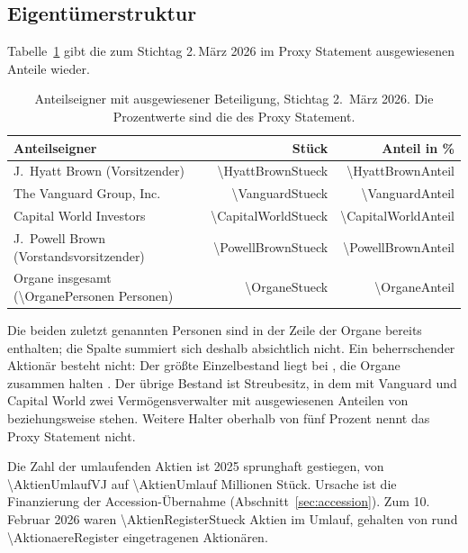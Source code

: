 \subsection{Eigent\"umerstruktur}

Tabelle~\ref{tab:eigentuemer} gibt die zum Stichtag 2.\,M\"arz 2026 im Proxy
Statement ausgewiesenen Anteile wieder.

\begin{table}[htbp]
\centering
\caption{Anteilseigner mit ausgewiesener Beteiligung, Stichtag 2.~M\"arz 2026.
Die Prozentwerte sind die des Proxy Statement.}
\label{tab:eigentuemer}
\begin{tabular}{lrr}
\toprule
Anteilseigner & St\"uck & Anteil in \%\\
\midrule
J.~Hyatt Brown (Vorsitzender)        & \num{\HyattBrownStueck}   & \num{\HyattBrownAnteil}\\
The Vanguard Group, Inc.             & \num{\VanguardStueck}     & \num{\VanguardAnteil}\\
Capital World Investors              & \num{\CapitalWorldStueck} & \num{\CapitalWorldAnteil}\\
J.~Powell Brown (Vorstandsvorsitzender) & \num{\PowellBrownStueck} & \num{\PowellBrownAnteil}\\
\midrule
Organe insgesamt (\num{\OrganePersonen} Personen) & \num{\OrganeStueck} & \num{\OrganeAnteil}\\
\bottomrule
\end{tabular}
\end{table}

Die beiden zuletzt genannten Personen sind in der
Zeile der Organe bereits enthalten; die Spalte summiert sich deshalb
absichtlich nicht. Ein beherrschender Aktion\"ar besteht nicht: Der gr\"o{\ss}te
Einzelbestand liegt bei \Pct{\HyattBrownAnteil}, die Organe zusammen halten
\Pct{\OrganeAnteil}. Der \"ubrige Bestand ist Streubesitz, in dem mit
Vanguard und Capital World zwei Verm\"ogensverwalter mit ausgewiesenen
Anteilen von \Pct{\VanguardAnteil} beziehungsweise \Pct{\CapitalWorldAnteil}
stehen. Weitere Halter oberhalb von f\"unf Prozent nennt das Proxy Statement
nicht.

Die Zahl der umlaufenden Aktien ist 2025 sprunghaft gestiegen, von
\num{\AktienUmlaufVJ} auf \num{\AktienUmlauf} Millionen
St\"uck. Ursache ist die
Finanzierung der Accession-\"Ubernahme (Abschnitt~\ref{sec:accession}). Zum
10.\,Februar 2026 waren \num{\AktienRegisterStueck} Aktien im Umlauf,
gehalten von rund \num{\AktionaereRegister} eingetragenen
Aktion\"aren.

